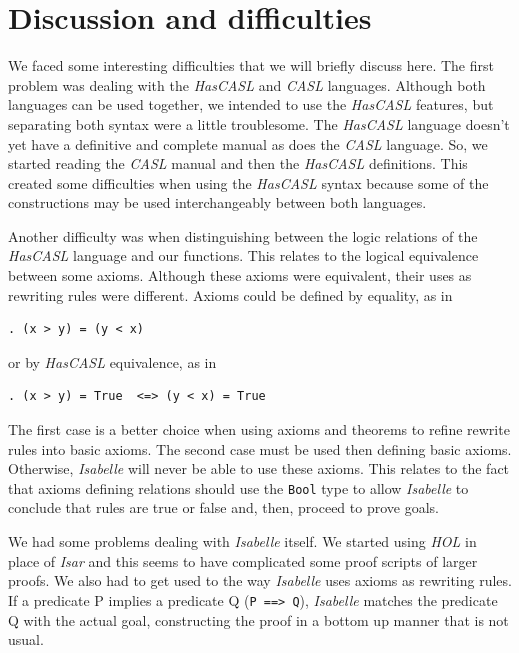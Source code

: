 \documentclass[12pt,twoside]{article}
\numberwithin{spec}{subsection}
\numberwithin{proof}{subsection}
\numberwithin{figure}{subsection}
\numberwithin{code}{subsection}
\begin{document}
\section{Discussion and difficulties}\label{Discussion}
We faced some interesting difficulties that we will briefly discuss here. The first problem was dealing with the \textit{HasCASL} and \textit{CASL} languages. Although both languages can be used together, we intended to use the \textit{HasCASL} features, but separating both syntax were a little troublesome. The \textit{HasCASL} language doesn't yet have a definitive and complete manual as does the \textit{CASL} language. So, we started reading the \textit{CASL} manual and then the \textit{HasCASL} definitions. This created some difficulties when using the \textit{HasCASL} syntax because some of the constructions may be used interchangeably between both languages.

Another difficulty was when distinguishing between the logic relations of the \textit{HasCASL} language and our functions. This relates to the logical equivalence between some axioms. Although these axioms were equivalent, their uses as rewriting rules were different. Axioms could be defined by equality, as in
\begin{verbatim}
. (x > y) = (y < x)
\end{verbatim}

or by \textit{HasCASL} equivalence, as in
\begin{verbatim}
. (x > y) = True  <=> (y < x) = True
\end{verbatim}

The first case is a better choice when using axioms and theorems to refine rewrite rules into basic axioms. The second case must be used then defining basic axioms. Otherwise, \textit{Isabelle} will never be able to use these axioms. This relates to the fact that axioms defining relations should use the \verb.Bool. type to allow \textit{Isabelle} to conclude that rules are true or false and, then, proceed to prove goals.

We had some problems dealing with \textit{Isabelle} itself. We started using \textit{HOL} in place of \textit{Isar} and this seems to have complicated some proof scripts of larger proofs. We also had to get used to the way \textit{Isabelle} uses axioms as rewriting rules. If a predicate P implies a predicate Q (\verb.P ==> Q.), \textit{Isabelle} matches the predicate Q with the actual goal, constructing the proof in a bottom up manner that is not usual.
\end{document}
